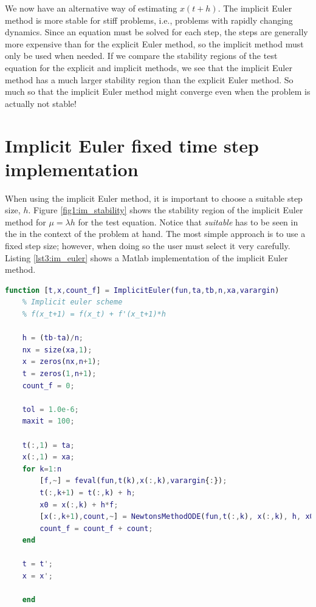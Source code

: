 We now have an alternative way of estimating $x(t+h)$. The implicit Euler method is more stable for stiff problems, i.e., problems with rapidly changing dynamics. Since an equation must be solved for each step, the steps are generally more expensive than for the explicit Euler method, so the implicit method must only be used when needed. If we compare the stability regions of the test equation for the explicit and implicit methods, we see that the implicit Euler method has a much larger stability region than the explicit Euler method. So much so that the implicit Euler method might converge even when the problem is actually not stable! 

\section{Implicit Euler fixed time step implementation}
When using the implicit Euler method, it is important to choose a suitable step size, $h$. Figure \ref{fig1:im_stability} shows the stability region of the implicit Euler method for $\mu = \lambda h$ for the test equation. Notice that \textit{suitable} has to be seen in the in the context of the problem at hand. The most simple approach is to use a fixed step size; however, when doing so the user must select it very carefully. Listing \ref{lst3:im_euler} shows a Matlab implementation of the implicit Euler method.

\begin{lstlisting}[language=Matlab,caption=Implicit Euler with fixed step size.,label=lst3:im_euler]
function [t,x,count_f] = ImplicitEuler(fun,ta,tb,n,xa,varargin)
    % Implicit euler scheme
    % f(x_t+1) = f(x_t) + f'(x_t+1)*h
    
    h = (tb-ta)/n;
    nx = size(xa,1);
    x = zeros(nx,n+1);
    t = zeros(1,n+1);
    count_f = 0; 

    tol = 1.0e-6;
    maxit = 100;

    t(:,1) = ta;
    x(:,1) = xa;
    for k=1:n
        [f,~] = feval(fun,t(k),x(:,k),varargin{:});
        t(:,k+1) = t(:,k) + h;
        x0 = x(:,k) + h*f;
        [x(:,k+1),count,~] = NewtonsMethodODE(fun,t(:,k), x(:,k), h, x0, tol, maxit,varargin{:});
        count_f = count_f + count;
    end

    t = t';
    x = x';

    end
\end{lstlisting}


